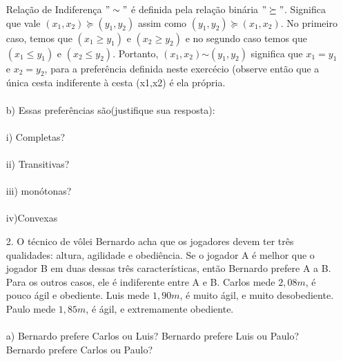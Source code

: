 \begin{enumerate}
Relação de Indiferença {$"\sim"$} é definida pela relação binária {$"\succeq"$}. Significa que vale {$(x_{1},x_{2})$}{$\succeq$}{$(y_{1},y_{2})$} assim como {$(y_{1},y_{2})$}{$\succeq$}{$(x_{1},x_{2})$}. No primeiro caso, temos que {$(x_1\geq y_1)$} e {$(x_2\geq y_2)$} e no segundo caso temos que {$(x_1\leq y_1)$} e {$(x_2\leq y_2)$}. Portanto, {$(x_1,x_2)$}{$\sim$}{$(y_1,y_2)$} signiﬁca que {$x_1 = y_1$} e {$x_2 = y_2$}, para a preferência deﬁnida neste exercécio (observe então que a única cesta indiferente à cesta (x1,x2) é ela própria. 



\paragraph{} b) Essas preferências são(justifique sua resposta):\\

\paragraph{} i) Completas?\\ 
\paragraph{} ii) Transitivas?\\
\paragraph{} iii) monótonas?\\
\paragraph{} iv)Convexas\\

\item[2.] O técnico de vôlei Bernardo acha que os jogadores devem ter três qualidades: altura, agilidade e obediência. Se o jogador A é melhor que o jogador B em duas dessas três características, então Bernardo prefere A a B. Para os outros casos, ele é indiferente entre A e B. Carlos mede {$2,08m$}, é pouco ágil e obediente. Luis mede {$1,90m$}, é muito ágil, e muito desobediente. Paulo mede {$1,85m$}, é ágil, e extremamente obediente.\\


\paragraph{}a) Bernardo prefere Carlos ou Luis? Bernardo prefere Luis ou Paulo? Bernardo prefere Carlos ou Paulo?\\


\end{enumerate}
